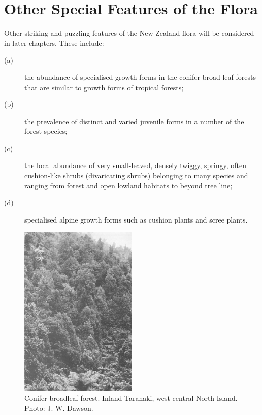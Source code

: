 \section{Other Special Features of the Flora}

Other striking and puzzling features of the New Zealand flora will be considered in later chapters.
These include:

\begin{description}
\item[{(a)}]the abundance of specialised growth forms in the conifer broad-leaf forests that are similar to growth forms of tropical forests;
\item[{(b)}]the prevalence of distinct and varied juvenile forms in a number of the forest species;
\item[{(c)}]the local abundance of very small-leaved, densely twiggy, springy, often cushion-like shrubs (divaricating shrubs) belonging to many species and ranging from forest and open lowland habitats to beyond tree line;
\item[{(d)}]specialised alpine growth forms such as cushion plants and scree plants.
\end{description}

\begin{figure}
	\includegraphics[width=0.5\textwidth]{graphics/figure6conifer-broadleaf.jpg}
	\centering
	\caption[Conifer broadleaf forest, inland Taranaki]{Conifer broadleaf forest.
Inland Taranaki, west central North Island.
	Photo: J. W. Dawson.}
	\label{fig:6conifer-broadleaf}
\end{figure}

